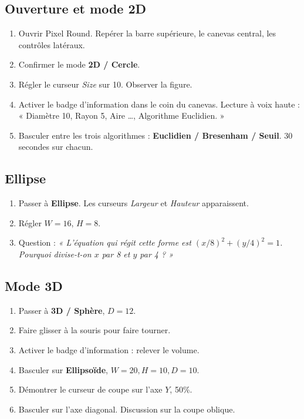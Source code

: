 \documentclass[12pt,a4paper]{scrartcl}
\newcommand{\acc}[1]{\textcolor{accent}{\textbf{#1}}}
\begin{document}
\subsection{Ouverture et mode 2D}
\begin{enumerate}[leftmargin=1.5em,itemsep=0.15em,topsep=0.3em]
  \item Ouvrir Pixel Round. Repérer la barre supérieure, le canevas central, les contrôles latéraux.
  \item Confirmer le mode \acc{2D / Cercle}.
  \item Régler le curseur \emph{Size} sur 10. Observer la figure.
  \item Activer le badge d'information dans le coin du canevas. Lecture à voix haute : « Diamètre 10, Rayon 5, Aire \dots, Algorithme Euclidien. »
  \item Basculer entre les trois algorithmes : \acc{Euclidien / Bresenham / Seuil}. 30 secondes sur chacun.
\end{enumerate}

\subsection{Ellipse}
\begin{enumerate}[leftmargin=1.5em,itemsep=0.15em,topsep=0.3em]
  \item Passer à \acc{Ellipse}. Les curseurs \emph{Largeur} et \emph{Hauteur} apparaissent.
  \item Régler $W = 16$, $H = 8$.
  \item Question : \emph{« L'équation qui régit cette forme est $(x/8)^2 + (y/4)^2 = 1$. Pourquoi divise-t-on $x$ par 8 et $y$ par 4 ? »}
\end{enumerate}

\subsection{Mode 3D}
\begin{enumerate}[leftmargin=1.5em,itemsep=0.15em,topsep=0.3em]
  \item Passer à \acc{3D / Sphère}, $D = 12$.
  \item Faire glisser à la souris pour faire tourner.
  \item Activer le badge d'information : relever le volume.
  \item Basculer sur \acc{Ellipsoïde}, $W = 20, H = 10, D = 10$.
  \item Démontrer le curseur de coupe sur l'axe $Y$, 50\%.
  \item Basculer sur l'axe diagonal. Discussion sur la coupe oblique.
\end{enumerate}
\end{document}
